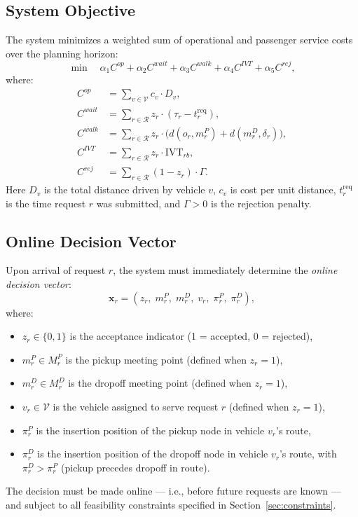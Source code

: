 \subsection*{System Objective}

The system minimizes a weighted sum of operational and passenger service costs over the
planning horizon:
\begin{equation}\label{eq:objective}
  \min \quad \alpha_1 C^{op} + \alpha_2 C^{wait} + \alpha_3 C^{walk}
             + \alpha_4 C^{IVT} + \alpha_5 C^{rej},
\end{equation}
where:
\begin{align}
  C^{op}   &= \sum_{v \in \mathcal{V}} c_v \cdot D_v, \label{eq:cop}\\
  C^{wait} &= \sum_{r \in \mathcal{R}} z_r \cdot (\tau_r - t_r^{\text{req}}), \label{eq:cwait}\\
  C^{walk} &= \sum_{r \in \mathcal{R}} z_r \cdot \bigl(d(o_r, m_r^P) + d(m_r^D, \delta_r)\bigr), \label{eq:cwalk}\\
  C^{IVT}  &= \sum_{r \in \mathcal{R}} z_r \cdot \text{IVT}_{rb}, \label{eq:civt}\\
  C^{rej}  &= \sum_{r \in \mathcal{R}} (1 - z_r) \cdot \Gamma. \label{eq:crej}
\end{align}
Here $D_v$ is the total distance driven by vehicle $v$, $c_v$ is cost per unit distance,
$t_r^{\text{req}}$ is the time request $r$ was submitted, and $\Gamma > 0$ is the rejection
penalty.

\subsection*{Online Decision Vector}

Upon arrival of request $r$, the system must immediately determine the \emph{online decision
vector}:
\begin{equation}\label{eq:decvec}
  \mathbf{x}_r = (z_r,\; m_r^P,\; m_r^D,\; v_r,\; \pi_r^P,\; \pi_r^D),
\end{equation}
where:
\begin{itemize}
  \item $z_r \in \{0,1\}$ is the acceptance indicator (1 = accepted, 0 = rejected),
  \item $m_r^P \in M_r^P$ is the pickup meeting point (defined when $z_r = 1$),
  \item $m_r^D \in M_r^D$ is the dropoff meeting point (defined when $z_r = 1$),
  \item $v_r \in \mathcal{V}$ is the vehicle assigned to serve request $r$ (defined when $z_r = 1$),
  \item $\pi_r^P$ is the insertion position of the pickup node in vehicle $v_r$'s route,
  \item $\pi_r^D$ is the insertion position of the dropoff node in vehicle $v_r$'s route,
        with $\pi_r^D > \pi_r^P$ (pickup precedes dropoff in route).
\end{itemize}
The decision must be made online --- i.e., before future requests are known --- and subject to
all feasibility constraints specified in Section~\ref{sec:constraints}.
